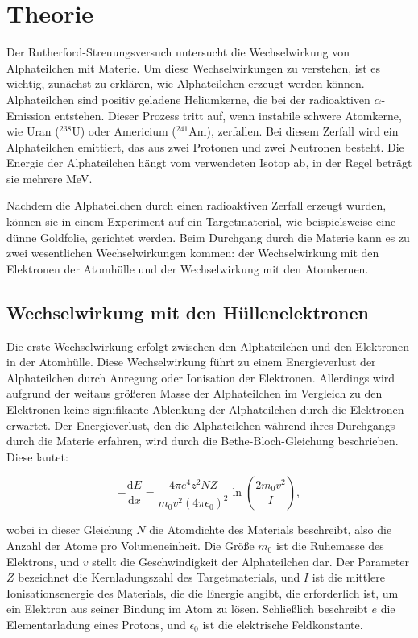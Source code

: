 \section[Theorie]{Theorie \textnormal{\cite{rutherford}}}

Der Rutherford-Streuungsversuch untersucht die Wechselwirkung von Alphateilchen mit Materie. Um diese Wechselwirkungen zu verstehen, ist es wichtig, zunächst zu erklären, wie Alphateilchen erzeugt werden können. Alphateilchen sind positiv geladene Heliumkerne, die bei der radioaktiven $\alpha$-Emission entstehen. Dieser Prozess tritt auf, wenn instabile schwere Atomkerne, wie Uran ($^{238}\mathrm{U}$) oder Americium ($^{241}\mathrm{Am}$), zerfallen. Bei diesem Zerfall wird ein Alphateilchen emittiert, das aus zwei Protonen und zwei Neutronen besteht. Die Energie der Alphateilchen hängt vom verwendeten Isotop ab, in der Regel beträgt sie mehrere MeV.

Nachdem die Alphateilchen durch einen radioaktiven Zerfall erzeugt wurden, können sie in einem Experiment auf ein Targetmaterial, wie beispielsweise eine dünne Goldfolie, gerichtet werden. Beim Durchgang durch die Materie kann es zu zwei wesentlichen Wechselwirkungen kommen: der Wechselwirkung mit den Elektronen der Atomhülle und der Wechselwirkung mit den Atomkernen.

\subsection*{Wechselwirkung mit den Hüllenelektronen}
Die erste Wechselwirkung erfolgt zwischen den Alphateilchen und den Elektronen in der Atomhülle. Diese Wechselwirkung führt zu einem Energieverlust der Alphateilchen durch Anregung oder Ionisation der Elektronen. Allerdings wird aufgrund der weitaus größeren Masse der Alphateilchen im Vergleich zu den Elektronen keine signifikante Ablenkung der Alphateilchen durch die Elektronen erwartet. Der Energieverlust, den die Alphateilchen während ihres Durchgangs durch die Materie erfahren, wird durch die Bethe-Bloch-Gleichung beschrieben. Diese lautet:

\[
-\frac{\mathrm{d}E}{\mathrm{d}x} = \frac{4 \pi e^4 z^2 N Z}{m_0 v^2 (4 \pi \epsilon_0)^2} \ln \left(\frac{2 m_0 v^2}{I}\right),
\]

wobei in dieser Gleichung $N$ die Atomdichte des Materials beschreibt, also die Anzahl der Atome pro Volumeneinheit. Die Größe $m_0$ ist die Ruhemasse des Elektrons, und $v$ stellt die Geschwindigkeit der Alphateilchen dar. Der Parameter $Z$ bezeichnet die Kernladungszahl des Targetmaterials, und $I$ ist die mittlere Ionisationsenergie des Materials, die die Energie angibt, die erforderlich ist, um ein Elektron aus seiner Bindung im Atom zu lösen. Schließlich beschreibt $e$ die Elementarladung eines Protons, und $\epsilon_0$ ist die elektrische Feldkonstante.

